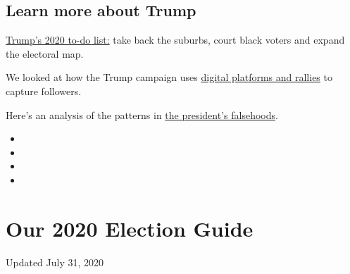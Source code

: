 \hypertarget{learn-more-about-trump}{%
\subsection{Learn more about Trump}\label{learn-more-about-trump}}

\href{https://www.nytimes.com/2020/02/08/us/politics/trump-reelection-campaign.html}{Trump's
2020 to-do list:} take back the suburbs, court black voters and expand
the electoral map.

We looked at how the Trump campaign uses
\href{https://www.nytimes.com/2020/02/27/us/politics/trump-rally-campaign-data.html}{digital
platforms and rallies} to capture followers.

Here's an analysis of the patterns in
\href{https://www.nytimes.com/2018/12/29/us/politics/trump-fact-check.html}{the
president's falsehoods}.

\begin{itemize}
\item
\item
\item
\item
\end{itemize}

\hypertarget{our-2020-election-guide}{%
\section{Our 2020 Election Guide}\label{our-2020-election-guide}}

Updated July 31, 2020


